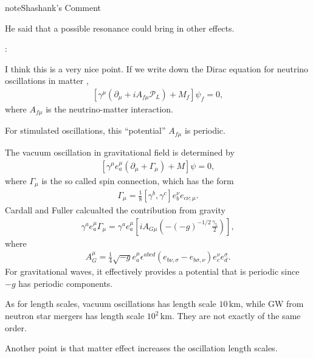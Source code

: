 \documentclass[letterpaper,12pt,english]{sphinxmanual}
\begin{document}
\begin{sphinxadmonition}{note}{Shashank's Comment}

He said that a possible resonance could bring in other effects.

:

I think this is a very nice point. If we write down the Dirac equation for neutrino oscillations in matter \label{\detokenize{gravity/gravitational-waves:id8}}{\hyperref[\detokenize{gravity/gravitational-waves:cardall1996}]{\sphinxcrossref{{[}Cardall1996{]}}}},
\begin{equation*}
\begin{split}[\gamma^\mu(\partial_\mu + i A_{f\mu} \mathscr P_L) + M_f] \psi_f = 0,\end{split}
\end{equation*}
where \(A_{f\mu}\) is the neutrino-matter interaction.

For stimulated oscillations, this ``potential'' \(A_{f\mu}\) is periodic.

The vacuum oscillation in gravitational field is determined by \label{\detokenize{gravity/gravitational-waves:id9}}{\hyperref[\detokenize{gravity/gravitational-waves:cardall1996}]{\sphinxcrossref{{[}Cardall1996{]}}}}
\begin{equation*}
\begin{split}[\gamma^\mu e^\mu_a (\partial_\mu + \Gamma_{\mu})+M]\psi=0,\end{split}
\end{equation*}
where \(\Gamma_\mu\) is the so called spin connection, which has the form
\begin{equation*}
\begin{split}\Gamma_\mu = \frac{1}{8} [\gamma^b,\gamma^c] e^\nu_b e_{c\nu;\mu}.\end{split}
\end{equation*}
Cardall and Fuller calcualted the contribution from gravity
\begin{equation*}
\begin{split}\gamma^a e^\mu_a \Gamma_\mu = \gamma^a e_a^\mu \left[ i A_{G\mu} \left( - (-g)^{-1/2} \frac{\gamma_5}{2} \right) \right],\end{split}
\end{equation*}
where
\begin{equation*}
\begin{split}A_G^\mu = \frac{1}{4} \sqrt{-g} e_a^\mu \epsilon^{abcd} (e_{b\nu,\sigma} - e_{b\sigma,\nu})e^\nu_{c} e^\sigma_d.\end{split}
\end{equation*}
For gravitational waves, it effectively provides a potential that is periodic since \(-g\) has periodic components.

As for length scales, vacuum oscillations has length scale \(10\,\mathrm{km}\), while GW from neutron star mergers has length scale \(10^2\,\mathrm{km}\). They are not exactly of the same order.

Another point is that matter effect increases the oscillation length scales.
\end{sphinxadmonition}
\end{document}
